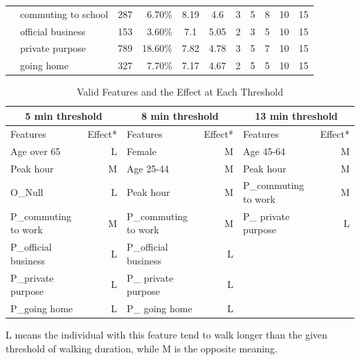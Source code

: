 \documentclass[Journal,letterpaper]{ascelike-new}
\begin{document}
\begin{table}[htbp]
\begin{tabular}{llrrccccccc}
 & commuting to school & 287   &  6.70\% & 8.19  & 4.6   & 3     & 5     & 8     & 10    & 15 \\
 & official business   & 153   &  3.60\% & 7.1   & 5.05  & 2     & 3     & 5     & 10    & 15 \\
 & private purpose     & 789   & 18.60\% & 7.82  & 4.78  & 3     & 5     & 7     & 10    & 15 \\
 & going home          & 327   &  7.70\% & 7.17  & 4.67  & 2     & 5     & 5     & 10    & 15 \\
%
        \hline\hline
    \end{tabular}
    \normalsize
\end{table}

%
\begin{table}[htbp]
    \caption{Valid Features and the Effect at Each Threshold}
    \label{table:3}
    \centering
    \begin{tabular}{lrlrlr}
    \hline\hline
    \multicolumn{2}{c}{5 min threshold} & \multicolumn{2}{c}{8 min threshold} & \multicolumn{2}{c}{13 min threshold} \\
    \hline
Features 	& Effect* 	& Features 	& Effect*		& Features 	& Effect* \\
Age over 65 			& L	& Female				& M	& Age 45-64				& M	\\
Peak hour				& M	& Age 25-44 			& M	& Peak hour 			& M	\\
O\_Null					& L	& Peak hour				& M	& P\_commuting to work 	& M \\
P\_commuting to work	& M	& P\_commuting to work  & M	& P\_ private purpose 	& L \\
P\_official business	& L & P\_official business	& L	&       				&  	\\
P\_private purpose		& L & P\_ private purpose	& L &       				&  	\\
P\_going home 			& L & P\_ going home 		& L &       				&   \\
    \hline\hline
    \end{tabular}
    \normalsize
%
    \begin{description}
        \label{note:1}
        \item[*Note:]
L means the individual with this feature tend to walk longer than the given threshold of walking duration, while M is the opposite meaning.
        \end{description}
\end{table}
\end{document}
